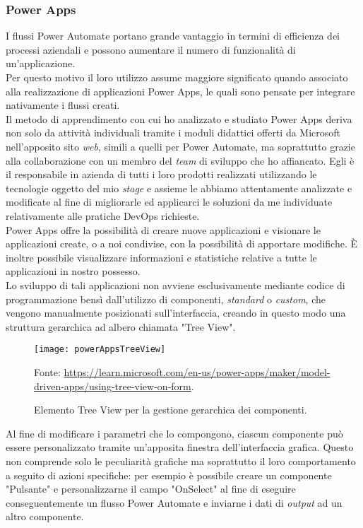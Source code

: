 \subsubsection*{Power Apps}
I flussi Power Automate portano grande vantaggio in termini di efficienza dei processi aziendali e possono aumentare il numero di funzionalità di un'applicazione.\\
Per questo motivo il loro utilizzo assume maggiore significato quando associato alla realizzazione di applicazioni Power Apps, le quali sono pensate per integrare nativamente i flussi creati.\\
Il metodo di apprendimento con cui ho analizzato e studiato Power Apps deriva non solo da attività individuali tramite i moduli didattici offerti da Microsoft nell'apposito sito \emph{web}, simili a quelli per Power Automate, ma soprattutto grazie alla collaborazione con un membro del \emph{team} di sviluppo che ho affiancato. Egli è il responsabile in azienda di tutti i loro prodotti realizzati utilizzando le tecnologie oggetto del mio \emph{stage} e assieme le abbiamo attentamente analizzate e modificate al fine di migliorarle ed applicarci le soluzioni da me individuate relativamente alle pratiche \gls{DevOps} richieste.\\
Power Apps offre la possibilità di creare nuove applicazioni e visionare le applicazioni create, o a noi condivise, con la possibilità di apportare modifiche. È inoltre possibile visualizzare informazioni e statistiche relative a tutte le applicazioni in nostro possesso.\\
Lo sviluppo di tali applicazioni non avviene esclusivamente mediante codice di programmazione bensì dall'utilizzo di componenti, \emph{standard} o \emph{custom}, che vengono manualmente posizionati sull'interfaccia, creando in questo modo una struttura gerarchica ad albero chiamata "Tree View".
\begin{figure}[htbp] 
    \centering 
    \texttt{[image: powerAppsTreeView]} 
    \caption{Elemento Tree View per la gestione gerarchica dei componenti.}
    \label{fig:powerAppsTreeView}
    \vspace{1mm}
    Fonte: \url{https://learn.microsoft.com/en-us/power-apps/maker/model-driven-apps/using-tree-view-on-form}.
\end{figure}
\newpage \noindent Al fine di modificare i parametri che lo compongono, ciascun componente può essere personalizzato tramite un'apposita finestra dell'interfaccia grafica. Questo non comprende solo le peculiarità grafiche ma soprattutto il loro comportamento a seguito di azioni specifiche: per esempio è possibile creare un componente "Pulsante" e personalizzarne il campo "OnSelect" al fine di eseguire conseguentemente un flusso Power Automate e inviarne i dati di \emph{output} ad un altro componente.\\
